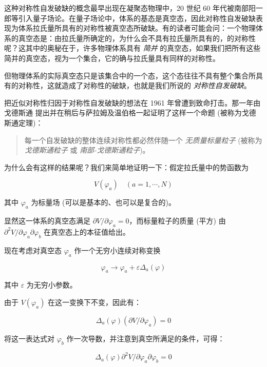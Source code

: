 \documentclass[oneside,a4paper,openany,11pt]{ctexbook}
\begin{document}
这种对称性自发破缺的概念最早出现在凝聚态物理中，20 世纪 60 年代被南部阳一郎等引入量子场论。在量子场论中，体系的基态是真空态，因此对称性自发破缺表现为体系拉氏量所具有的对称性被真空态所破缺。有的读者可能会问：一个物理体系的真空态是：由拉氏量所确定的，为什么会不具有拉氏量所具有的，的对称性呢？这其中的奥秘在于，许多物理体系具有 \emph{简并} 的真空态，如果我们把所有这些简并的真空态，视为一个集合，它的确与拉氏量具有同样的对称性。

但物理体系的实际真空态只是该集合中的一个态，这个态往往不具有整个集合所具有的对称性，这就造成了对称性的破缺，也就是我们所说的 \emph{对称性自发破缺}。

把近似对称性归因于对称性自发破缺的想法在 1961 年曾遭到致命打击。那一年由戈德斯通
提出并在稍后与萨拉姆及温伯格一起证明了这样一个命题 (被称为戈德斯通定理)：

\begin{quote}
    每一个自发破缺的整体连续对称性都必然伴随一个 \emph{无质量标量粒子} (被称为 \emph{戈德斯通粒子} 或 \emph{南部-戈德斯通粒子})。
\end{quote}

为什么会有这样的结果呢？我们来简单地证明一下：假定拉氏量中的势函数为

\begin{equation}
    V(\varphi_a) \quad (a=1, \cdots, N)
\end{equation}

\noindent 其中 $\varphi_a$ 为标量场 (可以是基本的、也可以是复合的)。

显然这一体系的真空态满足 $\partial V/\partial \varphi_a=0$，而标量粒子的质量 (平方) 由 $\partial^2 V/\partial \varphi_a \partial \varphi_b$ 在真空态上的本征值给出。

现在考虑对真空态 $\varphi_a$ 作一个无穷小连续对称变换

\begin{equation}
    \varphi_a \to \varphi_a + \varepsilon \Delta_a(\varphi)
\end{equation}

\noindent 其中 $\varepsilon$ 为无穷小参数。

由于 $V(\varphi_a)$ 在这一变换下不变，因此有：

\begin{equation}
    \Delta_a(\varphi) (\partial V/\partial \varphi_a)=0
\end{equation}

\noindent 将这一表达式对 $\varphi_b$ 作一次导数，并注意到真空所满足的条件，可得：

\begin{equation}
    \Delta_a(\varphi) \partial^2 V/\partial \varphi_a \partial \varphi_b=0
\end{equation}
\end{document}
